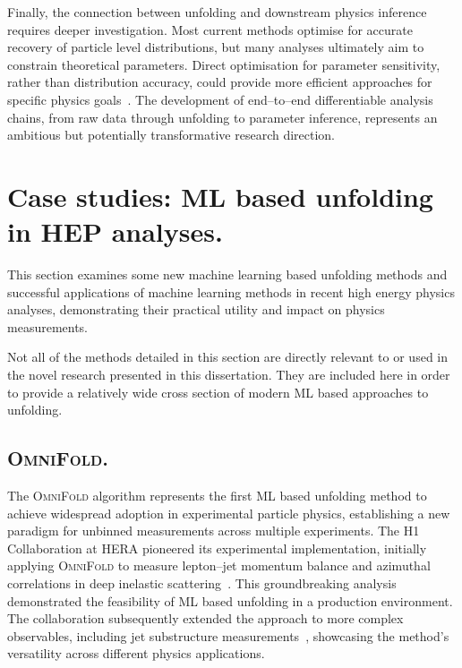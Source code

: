         Finally, the connection between unfolding and downstream physics inference requires deeper investigation.
        Most current methods optimise for accurate recovery of particle level distributions, but many analyses ultimately aim to constrain theoretical parameters.
        Direct optimisation for parameter sensitivity, rather than distribution accuracy, could provide more efficient approaches for specific physics goals~\cite{Brehmer2020EffectiveLearning}.
        The development of end--to--end differentiable analysis chains, from raw data through unfolding to parameter inference, represents an ambitious but potentially transformative research direction.

\section{Case studies: ML based unfolding in HEP analyses.}
\label{sec:ml-for-unfolding.case-studies}
\sectionminitoc
This section examines some new machine learning based unfolding methods and successful applications of machine learning methods in recent high energy physics analyses, demonstrating their practical utility and impact on physics measurements.

\begin{note*}
    Not all of the methods detailed in this section are directly relevant to or used in the novel research presented in this dissertation. They are included here in order to provide a relatively wide cross section of modern ML based approaches to unfolding.
\end{note*}
\subsection{\textsc{OmniFold}.}  
    The \textsc{OmniFold} algorithm represents the first ML based unfolding method to achieve widespread adoption in experimental particle physics, establishing a new paradigm for unbinned measurements across multiple experiments.
    The H1 Collaboration at HERA pioneered its experimental implementation, initially applying \textsc{OmniFold} to measure lepton--jet momentum balance and azimuthal correlations in deep inelastic scattering~\cite{collaboration_measurement_2022}.
    This groundbreaking analysis demonstrated the feasibility of ML based unfolding in a production environment.
    The collaboration subsequently extended the approach to more complex observables, including jet substructure measurements~\cite{collaboration_unbinned_2023,Arratia2025TowardsEvents}, showcasing the method's versatility across different physics applications.
    
